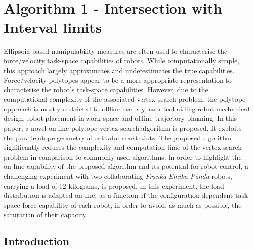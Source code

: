

\newcommand{\onum}[1]{\overline{{#1}}} 	%
\newcommand{\unum}[1]{\underline{{#1}}}  	%

\chapter{Algorithm 1 - Intersection with Interval limits}

Ellipsoid-based manipulability measures are often used to characterise the force/velocity task-space capabilities of robots. While computationally simple, this approach largely approximates and underestimates the true capabilities. Force/velocity polytopes appear to be a more appropriate representation to characterise the robot's task-space capabilities. However, due to the computational complexity of the associated vertex search problem, the polytope approach is mostly restricted to  offline use, \textit{e.g.} as a tool aiding robot mechanical design, robot placement in work-space and offline trajectory planning. In this paper, a novel on-line polytope vertex search algorithm is proposed. It exploits the parallelotope geometry of actuator constraints. The proposed algorithm significantly reduces the complexity and computation time of the vertex search problem in comparison to commonly used algorithms. In order to highlight the on-line capability of the proposed algorithm and its potential for robot control, a challenging experiment with two collaborating \textit{Franka Emika Panda} robots, carrying a load of 12 kilograms, is proposed. In this experiment, the load distribution is adapted on-line, as a function of the configuration dependant task-space force capability of each robot, in order to avoid, as much as possible, the saturation of their capacity.


\section{Introduction}

